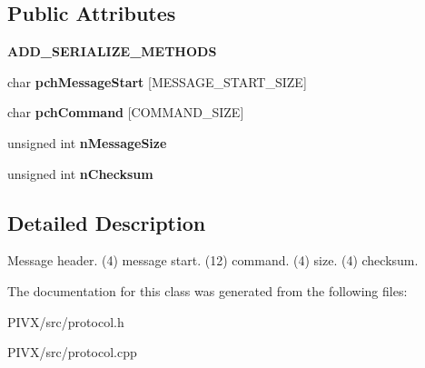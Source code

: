 \subsection*{Public Attributes}
\begin{DoxyCompactItemize}
\item 
\mbox{\label{class_c_message_header_a447044c3fbf9d5e98dcc4121ac808d2f}} 
{\bfseries A\+D\+D\+\_\+\+S\+E\+R\+I\+A\+L\+I\+Z\+E\+\_\+\+M\+E\+T\+H\+O\+DS}
\item 
\mbox{\label{class_c_message_header_a4284bf1d2fd792af89e1c93b7e6e274e}} 
char {\bfseries pch\+Message\+Start} \mbox{[}M\+E\+S\+S\+A\+G\+E\+\_\+\+S\+T\+A\+R\+T\+\_\+\+S\+I\+ZE\mbox{]}
\item 
\mbox{\label{class_c_message_header_a87d62b0d9afb3889f318991700a34431}} 
char {\bfseries pch\+Command} \mbox{[}C\+O\+M\+M\+A\+N\+D\+\_\+\+S\+I\+ZE\mbox{]}
\item 
\mbox{\label{class_c_message_header_a67ccb9f1f23af69e309a8d6c8bfff751}} 
unsigned int {\bfseries n\+Message\+Size}
\item 
\mbox{\label{class_c_message_header_ab9c6bec3694e2c110b4f358af9e55984}} 
unsigned int {\bfseries n\+Checksum}
\end{DoxyCompactItemize}


\subsection{Detailed Description}
Message header. (4) message start. (12) command. (4) size. (4) checksum. 

The documentation for this class was generated from the following files\+:\begin{DoxyCompactItemize}
\item 
P\+I\+V\+X/src/protocol.\+h\item 
P\+I\+V\+X/src/protocol.\+cpp\end{DoxyCompactItemize}
